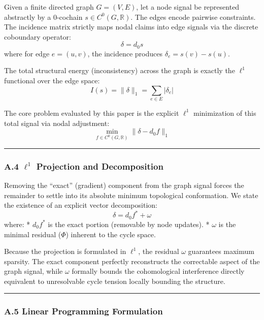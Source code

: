 \documentclass[
]{article}
\begin{document}
Given a finite directed graph \(G = (V,E)\), let a node signal be
represented abstractly by a 0-cochain \(s \in C^0(G, \mathbb{R})\). The
edges encode pairwise constraints. The incidence matrix strictly maps
nodal claims into edge signals via the discrete coboundary operator:
\[ \delta = d_0 s \] where for edge \(e=(u,v)\), the incidence produces
\(\delta_e = s(v) - s(u)\).

The total structural energy (inconsistency) across the graph is exactly
the \(\ell^1\) functional over the edge space:
\[ I(s) = \|\delta\|_1 = \sum_{e \in E} |\delta_e| \]

The core problem evaluated by this paper is the explicit \(\ell^1\)
minimization of this total signal via nodal adjustment:
\[ \min_{f \in C^0(G, \mathbb{R})} \|\delta - d_0 f\|_1 \]

\begin{center}\rule{0.5\linewidth}{0.5pt}\end{center}

\subsubsection{\texorpdfstring{A.4 \(\ell^1\) Projection and
Decomposition}{A.4 \textbackslash ell\^{}1 Projection and Decomposition}}\label{a.4-ell1-projection-and-decomposition}

Removing the ``exact'' (gradient) component from the graph signal forces
the remainder to settle into its absolute minimum topological
conformation. We state the existence of an explicit vector
decomposition: \[ \delta = d_0 f^* + \omega \] where: * \(d_0 f^*\) is
the exact portion (removable by node updates). * \(\omega\) is the
minimal residual (\(\Phi\)) inherent to the cycle space.

Because the projection is formulated in \(\ell^1\), the residual
\(\omega\) guarantees maximum sparsity. The exact component perfectly
reconstructs the correctable aspect of the graph signal, while
\(\omega\) formally bounds the cohomological interference directly
equivalent to unresolvable cycle tension locally bounding the structure.

\begin{center}\rule{0.5\linewidth}{0.5pt}\end{center}

\subsubsection{A.5 Linear Programming
Formulation}\label{a.5-linear-programming-formulation}
\end{document}
